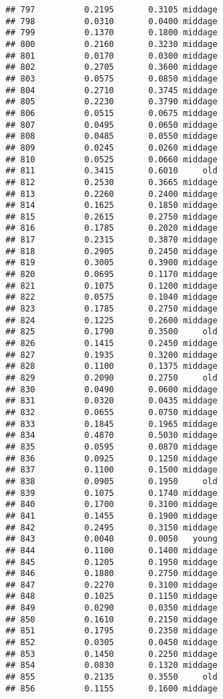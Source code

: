 \documentclass[
]{article}
\begin{document}
\begin{verbatim}
## 797          0.2195       0.3105 middage
## 798          0.0310       0.0400 middage
## 799          0.1370       0.1800 middage
## 800          0.2160       0.3230 middage
## 801          0.0170       0.0300 middage
## 802          0.2705       0.3600 middage
## 803          0.0575       0.0850 middage
## 804          0.2710       0.3745 middage
## 805          0.2230       0.3790 middage
## 806          0.0515       0.0675 middage
## 807          0.0495       0.0650 middage
## 808          0.0485       0.0550 middage
## 809          0.0245       0.0260 middage
## 810          0.0525       0.0660 middage
## 811          0.3415       0.6010     old
## 812          0.2530       0.3665 middage
## 813          0.2260       0.2400 middage
## 814          0.1625       0.1850 middage
## 815          0.2615       0.2750 middage
## 816          0.1785       0.2020 middage
## 817          0.2315       0.3870 middage
## 818          0.2905       0.2450 middage
## 819          0.3005       0.3900 middage
## 820          0.0695       0.1170 middage
## 821          0.1075       0.1200 middage
## 822          0.0575       0.1040 middage
## 823          0.1785       0.2750 middage
## 824          0.1225       0.2600 middage
## 825          0.1790       0.3500     old
## 826          0.1415       0.2450 middage
## 827          0.1935       0.3200 middage
## 828          0.1100       0.1375 middage
## 829          0.2090       0.2750     old
## 830          0.0490       0.0600 middage
## 831          0.0320       0.0435 middage
## 832          0.0655       0.0750 middage
## 833          0.1845       0.1965 middage
## 834          0.4870       0.5030 middage
## 835          0.0595       0.0870 middage
## 836          0.0925       0.1250 middage
## 837          0.1100       0.1500 middage
## 838          0.0905       0.1950     old
## 839          0.1075       0.1740 middage
## 840          0.1700       0.3100 middage
## 841          0.1455       0.1900 middage
## 842          0.2495       0.3150 middage
## 843          0.0040       0.0050   young
## 844          0.1100       0.1400 middage
## 845          0.1205       0.1950 middage
## 846          0.1880       0.2750 middage
## 847          0.2270       0.3100 middage
## 848          0.1025       0.1150 middage
## 849          0.0290       0.0350 middage
## 850          0.1610       0.2150 middage
## 851          0.1795       0.2350 middage
## 852          0.0305       0.0450 middage
## 853          0.1450       0.2250 middage
## 854          0.0830       0.1320 middage
## 855          0.2135       0.3550     old
## 856          0.1155       0.1600 middage

\end{verbatim}
\end{document}
